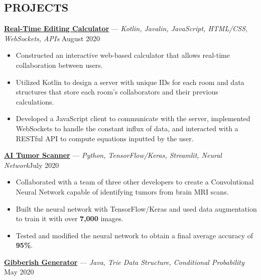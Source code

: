 \documentclass[11pt]{res}
\begin{document}
\begin{footnotesize}
\begin{resume}
\begin{small}
\section{PROJECTS}
\end{small} 
\vspace{.5mm}
\href{https://github.com/CharlesShi12/CalcShare}{\textbf{Real-Time Editing Calculator}} — {\sl Kotlin, Javalin, JavaScript, HTML/CSS, WebSockets, APIs} \hfill August 2020\vspace{-4.75mm}
\begin{itemize} \itemsep -2pt 
\item Constructed an interactive web-based calculator that allows real-time collaboration between users. 
\vspace{1mm}
\item Utilized Kotlin to design a server with unique IDs for each room and data structures that store each room's collaborators and their previous calculations.
\vspace{1mm}
\item Developed a JavaScript client to communicate with the server, implemented WebSockets to handle the constant influx of data, and interacted with a RESTful API to compute equations inputted by the user.  
\end{itemize}
\vspace{-2.5mm}
\href{https://github.com/CharlesShi12/AI_Tumor_Scanner}{\textbf{AI Tumor Scanner}} — {\sl Python, TensorFlow/Keras, Streamlit, Neural Network}\hfill July 2020\vspace{-4.75mm}
\begin{itemize} \itemsep -2pt 
\item Collaborated with a team of three other developers to create a Convolutional Neural Network capable of identifying tumors from brain MRI scans. 
\vspace{1mm}
\item Built the neural network with TensorFlow/Keras and used data augmentation to train it with over \textbf{7,000} images.
\vspace{1mm}
\item Tested and modified the neural network to obtain a final average accuracy of \textbf{95\%}.
\end{itemize}
\vspace{-2.5mm}
\href{https://github.com/CharlesShi12/GibberishGenerator}{\textbf{Gibberish Generator}} — {\sl Java, Trie Data Structure, Conditional Probability} \hfill May 2020\vspace{-4.75mm}

\end{resume}
\end{footnotesize}
\end{document}
